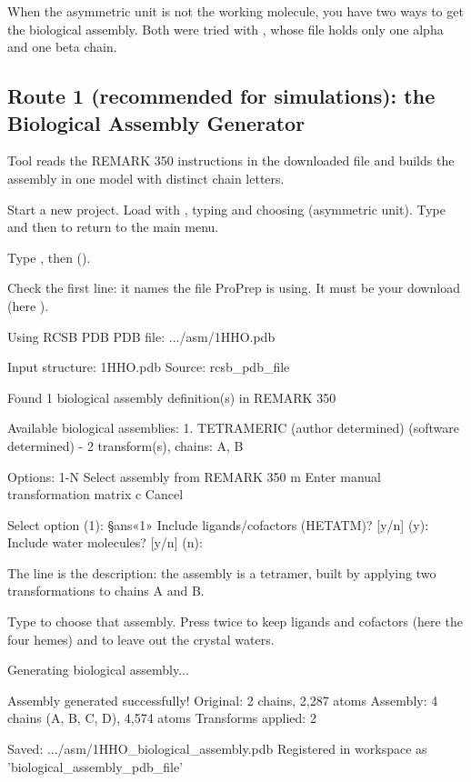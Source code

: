 When the asymmetric unit is not the working molecule, you have two ways to get
the biological assembly. Both were tried with , whose file holds only
one alpha and one beta chain.

\subsection{Route 1 (recommended for simulations): the Biological Assembly Generator}
\label{sec:structure-1b}

Tool  reads the REMARK 350 instructions in the downloaded file and
builds the assembly in one model with distinct chain letters.

\begin{steps}
  \item Start a new project. Load  with  \textrightarrow{}
         \textrightarrow{}  \textrightarrow{} , typing
         and choosing  (asymmetric unit). Type  and
        then  to return to the main menu.
  \item Type , then 
        ().
  \item Check the first line: it names the file ProPrep is using. It must be
        your download (here ).
\begin{screen}
Using RCSB PDB PDB file: .../asm/1HHO.pdb

Input structure: 1HHO.pdb
Source: rcsb_pdb_file

Found 1 biological assembly definition(s) in REMARK 350

Available biological assemblies:
  1. TETRAMERIC (author determined) (software determined) -
     2 transform(s), chains: A, B

Options:
  1-N  Select assembly from REMARK 350
  m    Enter manual transformation matrix
  c    Cancel

Select option (1): §ans«1»
Include ligands/cofactors (HETATM)? [y/n] (y):
Include water molecules? [y/n] (n):
\end{screen}
        The line  is
        the  description: the assembly is a tetramer,
        built by applying two transformations to chains A and B.
  \item Type  to choose that assembly. Press  twice to keep
        ligands and cofactors (here the four hemes) and to leave out the
        crystal waters.
\begin{screen}
Generating biological assembly...

Assembly generated successfully!
  Original: 2 chains, 2,287 atoms
  Assembly: 4 chains (A, B, C, D), 4,574 atoms
  Transforms applied: 2

Saved: .../asm/1HHO_biological_assembly.pdb
Registered in workspace as 'biological_assembly_pdb_file'
\end{screen}
\end{steps}

